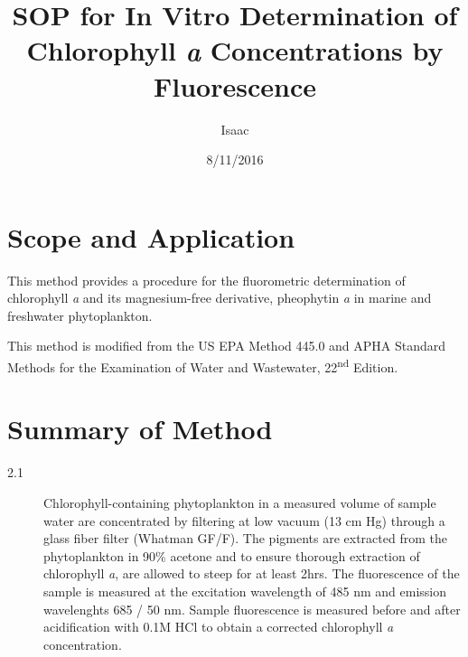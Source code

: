 \documentclass[12pt]{../SOP2}
\author{Isaac}
\title{SOP for In Vitro Determination of Chlorophyll \textit{a} Concentrations by Fluorescence}
\date{8/11/2016}
\begin{document}


\maketitle

\section{Scope and Application}

\NP This method provides a procedure for the fluorometric determination of chlorophyll \textit{a} and its magnesium-free derivative, pheophytin \textit{a} in marine and freshwater phytoplankton.

\NP This method is modified from the US EPA Method 445.0 and APHA Standard Methods for the Examination of Water and Wastewater, 22\textsuperscript{nd} Edition. 


\section{Summary of Method}
\begin{description}
  \item[2.1] Chlorophyll-containing phytoplankton in a measured volume of sample water are concentrated by filtering at low vacuum (13 cm Hg) through a glass fiber filter (Whatman GF/F). The pigments are extracted from the phytoplankton in 90\% acetone and to ensure thorough extraction of chlorophyll \textit{a}, are allowed to steep for at least 2hrs. The fluorescence of the sample is measured at the excitation wavelength of 485 nm and emission wavelenghts 685 / 50 nm. Sample fluorescence is measured before and after acidification with 0.1M HCl to obtain a corrected chlorophyll \textit{a} concentration. 
\end{description}
\end{document}
